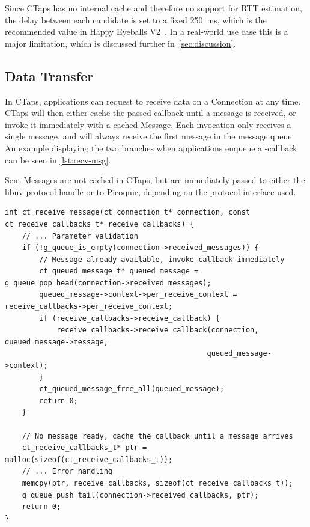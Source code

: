 Since CTaps has no internal cache and therefore no support for RTT estimation, the delay
between each candidate is set to a fixed \qty{250}{\milli\second}, which is the recommended value
in Happy Eyeballs V2~\cite{rfc8305}. In a real-world
use case this is a major limitation, which is discussed further in~\cref{sec:discussion}.

\subsection{Data Transfer}
In CTaps, applications can request to receive data on a Connection
at any time. CTaps will then either cache the passed 
callback until a message is received, or invoke it immediately with
a cached Message.
Each invocation only receives
a single message, and will always receive the first message in
the message queue.
An example displaying the two branches when
applications enqueue a -callback can be seen in \cref{lst:recv-msg}.

Sent Messages are not cached in CTaps, but are
immediately passed to either the libuv protocol handle or to Picoquic,
depending on the protocol interface used.

\begin{listing}[htbp]
  \begin{verbatim}
int ct_receive_message(ct_connection_t* connection, const ct_receive_callbacks_t* receive_callbacks) {
    // ... Parameter validation
    if (!g_queue_is_empty(connection->received_messages)) {
        // Message already available, invoke callback immediately
        ct_queued_message_t* queued_message = g_queue_pop_head(connection->received_messages);
        queued_message->context->per_receive_context = receive_callbacks->per_receive_context;
        if (receive_callbacks->receive_callback) {
            receive_callbacks->receive_callback(connection, queued_message->message,
                                               queued_message->context);
        }
        ct_queued_message_free_all(queued_message);
        return 0;
    }

    // No message ready, cache the callback until a message arrives
    ct_receive_callbacks_t* ptr = malloc(sizeof(ct_receive_callbacks_t));
    // ... Error handling
    memcpy(ptr, receive_callbacks, sizeof(ct_receive_callbacks_t));
    g_queue_push_tail(connection->received_callbacks, ptr);
    return 0;
}

  \end{verbatim}
  \caption[CTaps receive Message implementation]
  {
    Code for enqueueing receive callbacks in CTaps,
    showing how CTaps either invokes the callback immediately if a
    Message is already queued, or caches the callback until a Message arrives
  }
  \label{lst:recv-msg}
\end{listing}

